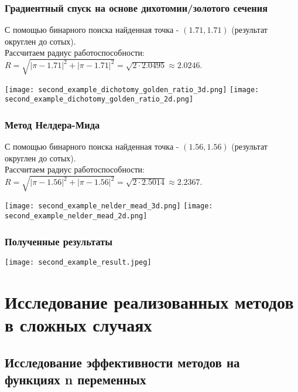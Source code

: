 \documentclass{article}
\begin{document}
\subsubsection*{Градиентный спуск на основе дихотомии/золотого сечения}
С помощью бинарного поиска найденная точка - $(1.71, 1.71)$ (результат округлен до сотых). \\ Рассчитаем радиус работоспособности: $R = \sqrt{|\pi - 1.71|^2 + |\pi - 1.71|^2} = \sqrt{2 \cdot 2.0495} \approx 2.0246$.
\begin{center}
    \texttt{[image: second\_example\_dichotomy\_golden\_ratio\_3d.png]}
    \texttt{[image: second\_example\_dichotomy\_golden\_ratio\_2d.png]}
    \label{fig:enter-label}
\end{center}
\subsubsection*{Метод Нелдера-Мида}
С помощью бинарного поиска найденная точка - $(1.56, 1.56)$ (результат округлен до сотых). \\ Рассчитаем радиус работоспособности: $R = \sqrt{|\pi - 1.56|^2 + |\pi - 1.56|^2} = \sqrt{2 \cdot 2.5014} \approx 2.2367$.
\begin{center}
    \texttt{[image: second\_example\_nelder\_mead\_3d.png]}
    \texttt{[image: second\_example\_nelder\_mead\_2d.png]}
    \label{fig:enter-label}
\end{center}
\subsubsection*{Полученные результаты}
\texttt{[image: second\_example\_result.jpeg]}

\newpage
\section*{Исследование реализованных методов в сложных случаях}
\subsection*{Исследование эффективности методов на функциях n переменных}
\end{document}
